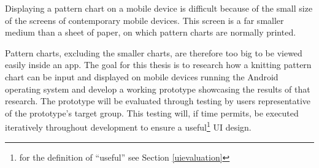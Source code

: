 Displaying a pattern chart on a mobile device is difficult because of the small size of the screens of contemporary mobile devices. This screen is a far smaller medium than a sheet of paper, on which pattern charts are normally printed. 

Pattern charts, excluding the smaller charts, are therefore too big to be viewed easily inside an app. The goal for this thesis is to research how a knitting pattern chart can be input and displayed on mobile devices running the Android operating system and develop a working prototype showcasing the results of that research. The prototype will be evaluated through testing by users representative of the prototype's target group. This testing will, if time permits, be executed iteratively throughout development to ensure a useful\footnote{for the definition of ``useful'' see Section \ref{uievaluation}} \gls{UI} design.
